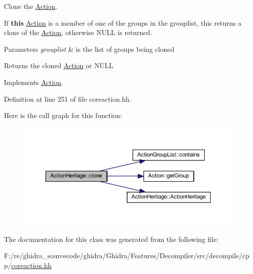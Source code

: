 Clone the \mbox{\hyperlink{class_action}{Action}}. 

If {\bfseries{this}} \mbox{\hyperlink{class_action}{Action}} is a member of one of the groups in the grouplist, this returns a clone of the \mbox{\hyperlink{class_action}{Action}}, otherwise N\+U\+LL is returned. 
\begin{DoxyParams}{Parameters}
{\em grouplist} & is the list of groups being cloned \\
\hline
\end{DoxyParams}
\begin{DoxyReturn}{Returns}
the cloned \mbox{\hyperlink{class_action}{Action}} or N\+U\+LL 
\end{DoxyReturn}


Implements \mbox{\hyperlink{class_action_af8242e41d09e5df52f97df9e65cc626f}{Action}}.



Definition at line 251 of file coreaction.\+hh.

Here is the call graph for this function\+:
\nopagebreak
\begin{figure}[H]
\begin{center}
\leavevmode
\includegraphics[width=350pt]{class_action_heritage_ac3da4f8c7eac163ec7c456dc6ed947fd_cgraph}
\end{center}
\end{figure}


The documentation for this class was generated from the following file\+:\begin{DoxyCompactItemize}
\item 
F\+:/re/ghidra\+\_\+sourcecode/ghidra/\+Ghidra/\+Features/\+Decompiler/src/decompile/cpp/\mbox{\hyperlink{coreaction_8hh}{coreaction.\+hh}}\end{DoxyCompactItemize}
